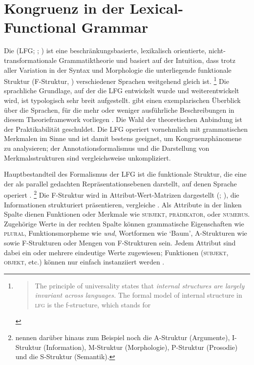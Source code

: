 \section{Kongruenz in der Lexical-Functional Grammar}
\label{sec:lfgkongr}

Die  (LFG;
\cites{kaplanbresnan1982,bresnan2001,bresnanetal2016}; \cites[zur Einführung
z.\,B.][]{buttking2015}[Kapitel~7]{mueller2020}) ist eine
beschränkungsbasierte, lexikalisch orientierte,
nicht-trans\allowbreak{}formationale Grammatiktheorie und basiert auf der
Intuition, dass trotz aller Variation in der Syntax und Morphologie die
unterliegende funktionale Struktur (F-Struktur,
) verschiedener Sprachen weitgehend gleich ist.%
%
	\footnote{\foreignblockcquote{english}[42]{bresnanetal2016}{The principle
		of universality states that \emph{internal structures are largely
		invariant across languages.} The formal model of internal structure in
		\textsc{lfg} is the f-structure, which stands for }.%
	}
%
Die sprachliche Grundlage, auf der die LFG entwickelt wurde und
weiterentwickelt wird, ist typologisch sehr breit aufgestellt.
\citet[221--222]{mueller2020} gibt einen exemplarischen Überblick über die
Sprachen, für die mehr oder weniger ausführliche Beschreibungen in diesem
Theorieframework vorliegen \autocites[zum modernen Standarddeutschen
vgl.][]{berman2003}{fortmann2006}. Die Wahl der theoretischen Anbindung ist der
Praktikabilität geschuldet. Die LFG operiert vornehmlich mit grammatischen
Merkmalen im Sinne  und ist damit bestens geeignet, um
Kongruenzphänomene zu analysieren; der Annotationsformalismus und die
Darstellung von Merkmalsstrukturen sind vergleichsweise unkompliziert.

Hauptbestandteil des Formalismus der LFG ist die funktionale Struktur, die eine
der als parallel gedachten Repräsentationsebenen darstellt, auf denen Sprache
operiert \autocite[840--844]{buttking2015}.%
%
	\footnote{\citet[862--865]{buttking2015} nennen darüber hinaus zum Beispiel
		noch die
		A-Struktur (Argumente),
		I-Struktur (Information),
		M-Struktur (Morphologie),
		P-Struktur (Prosodie)
		und die
		S-Struktur (Semantik).
	}
%
Die F-Struktur wird in Attribut-Wert-Matrizen dargestellt (; \cites[vgl.][44--45]{bresnanetal2016}[Kap.~6]{mueller2020}), die
Informationen strukturiert präsentieren, vergleiche . Als
Attribute in der linken Spalte dienen Funktionen oder Merkmale wie
\textsc{subjekt}, \textsc{prädikator}, oder \textsc{numerus}.
Zugehörige Werte in der rechten Spalte können grammatische Eigenschaften wie
\textsc{plural}, Funktionsmorpheme wie \textit{und}, Wortformen wie
`Baum', A-Strukturen wie  sowie F-Strukturen oder Mengen von F-Strukturen sein. Jedem
Attribut sind dabei ein oder mehrere eindeutige Werte zugewiesen; Funktionen
(\textsc{subjekt}, \textsc{objekt}, etc.) können nur einfach
instanziiert werden \autocite[vgl.][44--58]{bresnanetal2016}.

